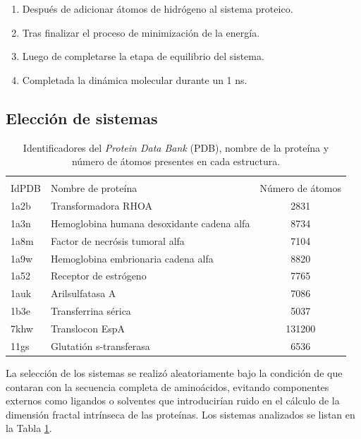  	\begin{enumerate}
 		\item Despu\'{e}s de adicionar \'{a}tomos de hidr\'{o}geno al sistema proteico. 
 		\item Tras finalizar el proceso de minimizaci\'{o}n de la energ\'{i}a.
 		\item Luego de completarse la etapa de equilibrio del sistema.
 		\item Completada la din\'{a}mica molecular durante un 1 ns.
 	\end{enumerate}
 	
 	
 	\subsection{Elecci\'{o}n de sistemas}
 	
 	\begin{table}[h!]
 		\centering
 		\begin{tabular}{llc}
 			\multicolumn{3}{c}{} \\ 
 			IdPDB & Nombre de prote\'{i}na & N\'{u}mero de \'{a}tomos \\
 			\hline
 			1a2b & Transformadora RHOA & 2831 \\
 			1a3n & Hemoglobina humana desoxidante cadena alfa & 8734 \\
 			1a8m & Factor de necr\'{o}sis tumoral alfa & 7104 \\
 			1a9w & Hemoglobina embrionaria cadena alfa & 8820 \\
 			1a52 & Receptor de estr\'{o}geno & 7765 \\
 			1auk & Arilsulfatasa A & 7086 \\
 			1b3e & Transferrina s\'{e}rica & 5037 \\
 			7khw & Translocon EspA & 131200 \\
 			11gs & Glutati\'{o}n s-transferasa & 6536 \\ 
 			\hline
 		\end{tabular}
 		\caption{Identificadores del \emph{Protein Data Bank} (PDB), nombre de la prote\'{i}na y n\'{u}mero de \'{a}tomos presentes en cada estructura.}
 		\label{Tabla:ids}
 	\end{table}
 	
 	
 	
 	La selecci\'{o}n de los sistemas se realiz\'{o} aleatoriamente bajo la condici\'{o}n de que contaran con la secuencia completa de amino\'{a}cidos, evitando componentes externos como ligandos o solventes que introducir\'{i}an ruido en el c\'{a}lculo de la dimensi\'{o}n fractal intr\'{i}nseca de las prote\'{i}nas. Los sistemas analizados se listan en la Tabla \ref{Tabla:ids}.
 
